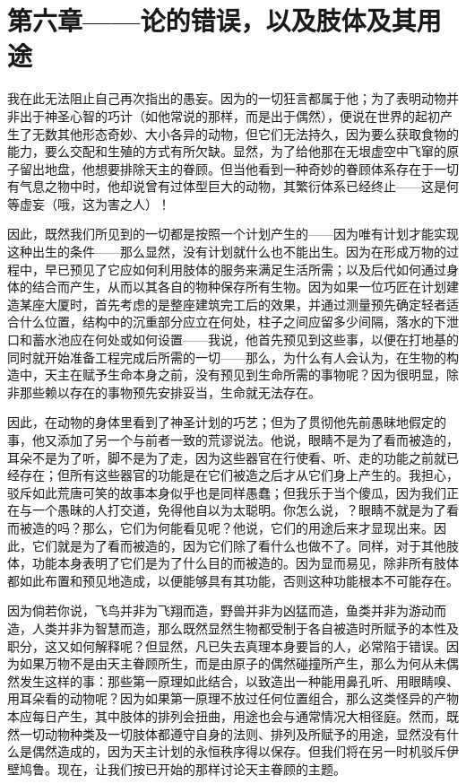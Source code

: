 
\section{第六章——论的错误，以及肢体及其用途}

我在此无法阻止自己再次指出的愚妄。因为的一切狂言都属于他；为了表明动物并非出于神圣心智的巧计（如他常说的那样，而是出于偶然），便说在世界的起初产生了无数其他形态奇妙、大小各异的动物，但它们无法持久，因为要么获取食物的能力，要么交配和生殖的方式有所欠缺。显然，为了给他那在无垠虚空中飞窜的原子留出地盘，他想要排除天主的眷顾。但当他看到一种奇妙的眷顾体系存在于一切有气息之物中时，他却说曾有过体型巨大的动物，其繁衍体系已经终止——这是何等虚妄（哦，这为害之人）！\par

因此，既然我们所见到的一切都是按照一个计划产生的——因为唯有计划才能实现这种出生的条件——那么显然，没有计划就什么也不能出生。因为在形成万物的过程中，早已预见了它应如何利用肢体的服务来满足生活所需；以及后代如何通过身体的结合而产生，从而以其各自的物种保存所有生物。因为如果一位巧匠在计划建造某座大厦时，首先考虑的是整座建筑完工后的效果，并通过测量预先确定轻者适合什么位置，结构中的沉重部分应立在何处，柱子之间应留多少间隔，落水的下泄口和蓄水池应在何处或如何设置——我说，他首先预见到这些事，以便在打地基的同时就开始准备工程完成后所需的一切——那么，为什么有人会认为，在生物的构造中，天主在赋予生命本身之前，没有预见到生命所需的事物呢？因为很明显，除非那些赖以存在的事物预先安排妥当，生命就无法存在。\par

因此，在动物的身体里看到了神圣计划的巧艺；但为了贯彻他先前愚昧地假定的事，他又添加了另一个与前者一致的荒谬说法。他说，眼睛不是为了看而被造的，耳朵不是为了听，脚不是为了走，因为这些器官在行使看、听、走的功能之前就已经存在；但所有这些器官的功能是在它们被造之后才从它们身上产生的。我担心，驳斥如此荒唐可笑的故事本身似乎也是同样愚蠢；但我乐于当个傻瓜，因为我们正在与一个愚昧的人打交道，免得他自以为太聪明。你怎么说，？眼睛不就是为了看而被造的吗？那么，它们为何能看见呢？他说，它们的用途后来才显现出来。因此，它们就是为了看而被造的，因为它们除了看什么也做不了。同样，对于其他肢体，功能本身表明了它们是为了什么目的而被造的。因为显而易见，除非所有肢体都如此布置和预见地造成，以便能够具有其功能，否则这种功能根本不可能存在。\par

因为倘若你说，飞鸟并非为飞翔而造，野兽并非为凶猛而造，鱼类并非为游动而造，人类并非为智慧而造，那么既然显然生物都受制于各自被造时所赋予的本性及职分，这又如何解释呢？但显然，凡已失去真理本身要旨的人，必常陷于错误。因为如果万物不是由天主眷顾所生，而是由原子的偶然碰撞所产生，那么为何从未偶然发生这样的事：那些第一原理如此结合，以致造出一种能用鼻孔听、用眼睛嗅、用耳朵看的动物呢？因为如果第一原理不放过任何位置组合，那么这类怪异的产物本应每日产生，其中肢体的排列会扭曲，用途也会与通常情况大相径庭。然而，既然一切动物种类及一切肢体都遵守自身的法则、排列及所赋予的用途，显然没有什么是偶然造成的，因为天主计划的永恒秩序得以保存。但我们将在另一时机驳斥伊壁鸠鲁。现在，让我们按已开始的那样讨论天主眷顾的主题。\par

